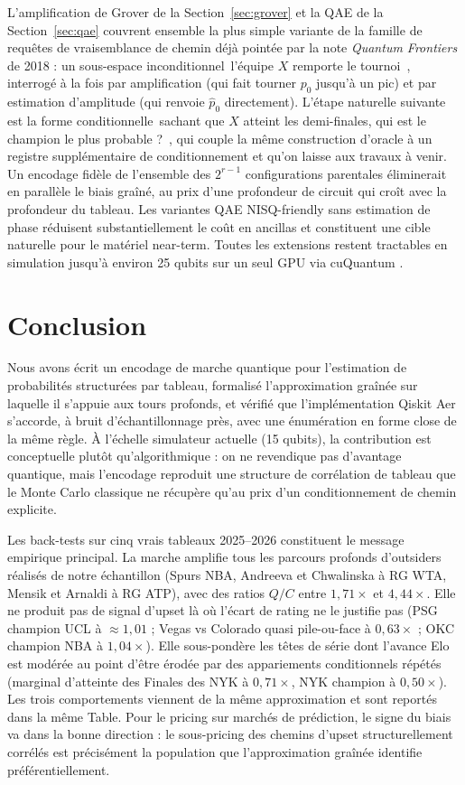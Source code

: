 \documentclass[11pt]{article}
\providecommand{\og}{\guillemotleft\,}
\providecommand{\fg}{\,\guillemotright}
\begin{document}
L'amplification de Grover de la Section~\ref{sec:grover} et la QAE
de la Section~\ref{sec:qae} couvrent ensemble la plus simple
variante de la famille de requêtes de vraisemblance de chemin déjà
pointée par la note \emph{Quantum Frontiers} de 2018
\cite{quantumfrontiers_wc_2018} : un sous-espace inconditionnel
\og l'équipe $X$ remporte le tournoi \fg{}, interrogé à la fois par
amplification (qui fait tourner $p_0$ jusqu'à un pic) et par
estimation d'amplitude (qui renvoie $\hat p_0$ directement). L'étape
naturelle suivante est la forme conditionnelle \og sachant que $X$
atteint les demi-finales, qui est le champion le plus probable ? \fg{},
qui couple la même construction d'oracle à un registre supplémentaire
de conditionnement et qu'on laisse aux travaux à venir. Un encodage
fidèle de l'ensemble des $2^{r-1}$ configurations parentales
éliminerait en parallèle le biais graîné, au prix d'une profondeur de
circuit qui croît avec la profondeur du tableau. Les variantes QAE
NISQ-friendly sans estimation de phase \cite{suzuki2020amplitude}
réduisent substantiellement le coût en ancillas et constituent une
cible naturelle pour le matériel near-term. Toutes les extensions
restent tractables en simulation jusqu'à environ 25 qubits sur un seul
GPU via cuQuantum \cite{cuquantum_benchmark_2023}.

\FloatBarrier
\section{Conclusion}

Nous avons écrit un encodage de marche quantique pour l'estimation de
probabilités structurées par tableau, formalisé l'approximation
graînée sur laquelle il s'appuie aux tours profonds, et vérifié que
l'implémentation Qiskit Aer s'accorde, à bruit d'échantillonnage
près, avec une énumération en forme close de la même règle. À
l'échelle simulateur actuelle (15 qubits), la contribution est
conceptuelle plutôt qu'algorithmique : on ne revendique pas
d'avantage quantique, mais l'encodage reproduit une structure de
corrélation de tableau que le Monte Carlo classique ne récupère qu'au
prix d'un conditionnement de chemin explicite.

Les back-tests sur cinq vrais tableaux 2025--2026 constituent le
message empirique principal. La marche amplifie tous les parcours
profonds d'outsiders réalisés de notre échantillon (Spurs NBA,
Andreeva et Chwalinska à RG WTA, Mensik et Arnaldi à RG ATP), avec
des ratios $Q/C$ entre $1{,}71\times$ et $4{,}44\times$. Elle ne
produit pas de signal d'upset là où l'écart de rating ne le justifie
pas (PSG champion UCL à $\approx 1{,}01$ ; Vegas vs Colorado
quasi pile-ou-face à $0{,}63\times$ ; OKC champion NBA à
$1{,}04\times$). Elle sous-pondère les têtes de série dont l'avance
Elo est modérée au point d'être érodée par des appariements
conditionnels répétés (marginal d'atteinte des Finales des NYK à
$0{,}71\times$, NYK champion à $0{,}50\times$). Les trois
comportements viennent de la même approximation et sont reportés dans
la même Table. Pour le pricing sur marchés de prédiction, le signe du
biais va dans la bonne direction : le sous-pricing des chemins
d'upset structurellement corrélés est précisément la population que
l'approximation graînée identifie préférentiellement.
\end{document}
